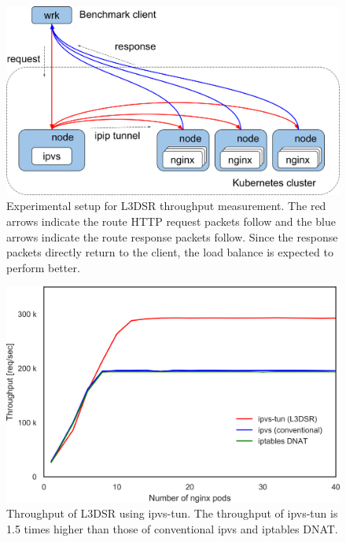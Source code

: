 \begin{figure}[h]
  \centering
  \includegraphics[width=0.8\columnwidth]{Figs/benchmark-schem-dsr}
  \par\bigskip
  \centering
  \begin{minipage}{0.9\columnwidth}
    \caption[Experimental setup for L3DSR throughput measurement]{
      Experimental setup for L3DSR throughput measurement.
      The red arrows indicate the route HTTP request packets follow and the blue arrows indicate the route response packets follow.
      Since the response packets directly return to the client, the load balance is expected to perform better.
    }
    \label{fig:benchmark-schem-dsr}
  \end{minipage}
\end{figure}

\begin{figure}[h]
  \centering
  \includegraphics[width=0.75\columnwidth]{Figs/ipvs_l3dsr_1g.png}
  \par\bigskip
  \centering
  \begin{minipage}{0.9\columnwidth}
    \caption[Throughput of L3DSR using ipvs-tun.]{
      Throughput of L3DSR using ipvs-tun.
      The throughput of ipvs-tun is 1.5 times higher than those of conventional ipvs and iptables DNAT.
    }
    \label{fig:ipvs_l3dsr_1g.png}
  \end{minipage}
\end{figure}

